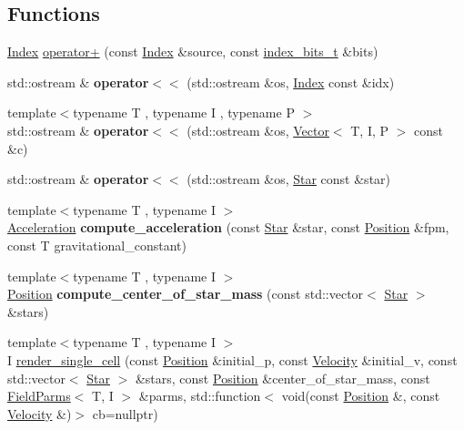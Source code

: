 \subsection*{Functions}
\begin{DoxyCompactItemize}
\item 
\hyperlink{structmgs_1_1Index}{Index} \hyperlink{namespacemgs_aa3d52c646ace701de74ece1b83e81c3d}{operator+} (const \hyperlink{structmgs_1_1Index}{Index} \&source, const \hyperlink{namespacemgs_a40c361242ea98fb1ff1241d06f7d5568}{index\+\_\+bits\+\_\+t} \&bits)
\item 
\mbox{\label{namespacemgs_a522006625245012a736f3e54bcc762cb}} 
std\+::ostream \& {\bfseries operator$<$$<$} (std\+::ostream \&os, \hyperlink{structmgs_1_1Index}{Index} const \&idx)
\item 
\mbox{\label{namespacemgs_aa10eec5254d6d1163efbdcc6a26d8313}} 
{\footnotesize template$<$typename T , typename I , typename P $>$ }\\std\+::ostream \& {\bfseries operator$<$$<$} (std\+::ostream \&os, \hyperlink{structmgs_1_1Vector}{Vector}$<$ T, I, P $>$ const \&c)
\item 
\mbox{\label{namespacemgs_adf73083db7cf46490ad2fa29742ba85d}} 
std\+::ostream \& {\bfseries operator$<$$<$} (std\+::ostream \&os, \hyperlink{structmgs_1_1Star}{Star} const \&star)
\item 
\mbox{\label{namespacemgs_a85e81c126aeacd489c95b39ed7a9758f}} 
{\footnotesize template$<$typename T , typename I $>$ }\\\hyperlink{structmgs_1_1Vector}{Acceleration} {\bfseries compute\+\_\+acceleration} (const \hyperlink{structmgs_1_1Star}{Star} \&star, const \hyperlink{structmgs_1_1Vector}{Position} \&fpm, const T gravitational\+\_\+constant)
\item 
\mbox{\label{namespacemgs_a9201b5d2cc34cb4ca38c73f203255ab7}} 
{\footnotesize template$<$typename T , typename I $>$ }\\\hyperlink{structmgs_1_1Vector}{Position} {\bfseries compute\+\_\+center\+\_\+of\+\_\+star\+\_\+mass} (const std\+::vector$<$ \hyperlink{structmgs_1_1Star}{Star} $>$ \&stars)
\item 
{\footnotesize template$<$typename T , typename I $>$ }\\I \hyperlink{namespacemgs_aa8de51b8fb971ca949d932b8348298d1}{render\+\_\+single\+\_\+cell} (const \hyperlink{structmgs_1_1Vector}{Position} \&initial\+\_\+p, const \hyperlink{structmgs_1_1Vector}{Velocity} \&initial\+\_\+v, const std\+::vector$<$ \hyperlink{structmgs_1_1Star}{Star} $>$ \&stars, const \hyperlink{structmgs_1_1Vector}{Position} \&center\+\_\+of\+\_\+star\+\_\+mass, const \hyperlink{structmgs_1_1FieldParms}{Field\+Parms}$<$ T, I $>$ \&parms, std\+::function$<$ void(const \hyperlink{structmgs_1_1Vector}{Position} \&, const \hyperlink{structmgs_1_1Vector}{Velocity} \&)$>$ cb=nullptr)

\end{DoxyCompactItemize}
